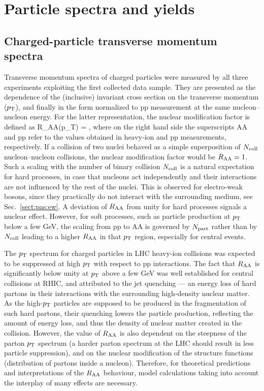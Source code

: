 \section{Particle spectra and yields}
\label{secks:spectra}
\subsection{Charged-particle transverse momentum spectra}
\label{subsecks:transspectra}
Transverse momentum spectra of charged particles were measured by all three experiments exploiting the first collected data sample. They are presented as the dependence of the (inclusive) invariant cross section on the transverse momentum ($p_{\rm T}$), and finally in the form normalized to pp measurement at the same nucleon--nucleon energy. For the latter representation, the nuclear modification factor is defined as
\be
R_{\rm AA}(p_{\rm T}) =  ,
\label{eqks:RAA}
\ee
where on the right hand side the superscripts AA and pp refer to the values obtained in heavy-ion and pp measurements, respectively. If a collision of two nuclei behaved as a simple superposition of $N_{\rm coll}$ nucleon--nucleon collisions, the nuclear modification factor would be $R_{\rm AA} = 1$. Such a scaling with the number of binary collision $N_{\rm coll}$ is a natural expectation for hard processes, in case that nucleons act independently and their interactions are not influenced by the rest of the nuclei. This is observed for electro-weak bosons, since they practically do not interact with the surrounding medium, see Sec.~\ref{sect:pas:ew}. A deviation of $R_{\rm AA}$ from unity for hard processes signals a nuclear effect. However, for soft processes, such as particle production at $p_{\rm T}$ below a few GeV, the scaling from pp to AA is governed by $N_{\rm part}$ rather than by $N_{\rm coll}$ leading to a higher $R_{\rm AA}$ in that $p_{\rm T}$ region, especially for central events.

The $p_{\rm T}$ spectrum for charged particles in LHC heavy-ion collisions was expected to be suppressed at high $p_{\rm T}$ with respect to pp interactions. The fact that $R_{\rm AA}$ is significantly below unity at $p_{\rm T}$ above a few GeV was well established for central collisions at RHIC, and attributed to the jet quenching --- an energy loss of hard partons in their interactions with the surrounding high-density nuclear matter. As the high-$p_{\rm T}$ particles are supposed to be produced in the fragmentation of such hard partons, their quenching lowers the particle production, reflecting the amount of energy loss, and thus the density of nuclear matter created in the collision. However, the value of $R_{\rm AA}$ is also dependent on the steepness of the parton $p_{\rm T}$ spectrum (a harder parton spectrum at the LHC should result in less particle suppression), and on the nuclear modification of the structure functions (distribution of partons inside a nucleon). Therefore, for theoretical predictions and interpretations of the $R_{\rm AA}$ behaviour, model calculations taking into account the interplay of many effects are necessary.

